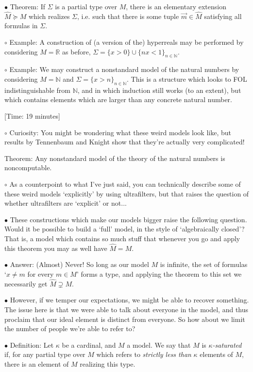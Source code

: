 \documentclass{article}
\newcommand{\N}{\mathbb{N}}
\newcommand{\R}{\mathbb{R}}
\newcommand\Point[1]{\noindent \hspace{\labelsep} {\large $\bullet$ #1} \smallskip}
\newcommand\point[1]{\noindent \hspace{\labelsep} {\small $\circ$ #1} \smallskip}
\newcommand\timestamp[1]{\noindent \hspace{\labelsep} [Time: #1] }
\begin{document}
\Point{Theorem: If $\Sigma$ is a partial type over $M$, there is an elementary extension $\hat M \succeq M$ which realizes $\Sigma$, i.e. such that there is some tuple $\vec m \in \hat M$ satisfying all formulas in $\Sigma$.}

\point{Example: A construction of (a version of the) hyperreals may be performed by considering $M = \R$ as before, $\Sigma = \{x > 0\} \cup \{n x < 1 \}_{n \in \N}$.}

\point{Example: We may construct a nonstandard model of the natural numbers by considering $M = \N$ and $\Sigma = \{x > n\}_{n \in \N}$. This is a structure which looks to FOL indistinguishable from $\N$, and in which induction still works (to an extent), but which contains elements which are larger than any concrete natural number.}

\timestamp{19 minutes}

\point{Curiosity: You might be wondering what these weird models look like, but results by Tennenbaum and Knight show that they're actually very complicated!

Theorem: Any nonstandard model of the theory of the natural numbers is noncomputable.}

\point{As a counterpoint to what I've just said, you can technically describe some of these weird models `explicitly' by using ultrafilters, but that raises the question of whether ultrafilters are `explicit' or not...}

\Point{These constructions which make our models bigger raise the following question. Would it be possible to build a `full' model, in the style of `algebraically closed'? That is, a model which contains so much stuff that whenever you go and apply this theorem you may as well have $\hat M = M$.}

\Point{Answer: (Almost) Never! So long as our model $M$ is infinite, the set of formulas `$x \neq m$ for every $m \in M$' forms a type, and applying the theorem to this set we necessarily get $\hat M \supsetneq M$.}

\Point{However, if we temper our expectations, we might be able to recover something. The issue here is that we were able to talk about everyone in the model, and thus proclaim that our ideal element is distinct from everyone. So how about we limit the number of people we're able to refer to?}

\Point{Definition: Let $\kappa$ be a cardinal, and $M$ a model. We say that $M$ is \emph{$\kappa$-saturated} if, for any partial type over $M$ which refers to \emph{strictly less than} $\kappa$ elements of $M$, there is an element of $M$ realizing this type.}
\end{document}
